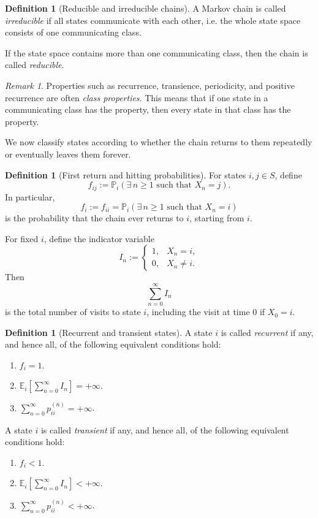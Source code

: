 \documentclass[11pt]{article}
\theoremstyle{plain}
\theoremstyle{definition}
\newtheorem{definition}[theorem]{Definition}
\theoremstyle{remark}
\newtheorem{remark}[theorem]{Remark}
\begin{document}
\begin{definition}[Reducible and irreducible chains]
	A Markov chain is called \emph{irreducible} if all states communicate with each other, i.e. the whole state space consists of one communicating class.
	
	If the state space contains more than one communicating class, then the chain is called \emph{reducible}.
\end{definition}

\begin{remark}
	Properties such as recurrence, transience, periodicity, and positive recurrence are often \emph{class properties}. This means that if one state in a communicating class has the property, then every state in that class has the property.
\end{remark}





We now classify states according to whether the chain returns to them repeatedly or eventually leaves them forever.

\begin{definition}[First return and hitting probabilities]
	For states \(i,j\in S\), define
	\[
	f_{ij}:=\mathbb{P}_i(\exists\, n\ge 1 \text{ such that } X_n=j).
	\]
	In particular,
	\[
	f_i:=f_{ii}
	=
	\mathbb{P}_i(\exists\, n\ge 1 \text{ such that } X_n=i)
	\]
	is the probability that the chain ever returns to \(i\), starting from \(i\).
\end{definition}

For fixed \(i\), define the indicator variable
\[
I_n
:=
\begin{cases}
	1, & X_n=i,\\
	0, & X_n\neq i.
\end{cases}
\]
Then
\[
\sum_{n=0}^{\infty}I_n
\]
is the total number of visits to state \(i\), including the visit at time \(0\) if \(X_0=i\).

\begin{definition}[Recurrent and transient states]
	A state \(i\) is called \emph{recurrent} if any, and hence all, of the following equivalent conditions hold:
	\begin{enumerate}
		\item \(f_i=1\).
		\item \(\displaystyle \mathbb{E}_i\!\left[\sum_{n=0}^{\infty}I_n\right]=+\infty\).
		\item \(\displaystyle \sum_{n=0}^{\infty}p_{ii}^{(n)}=+\infty\).
	\end{enumerate}
	
	A state \(i\) is called \emph{transient} if any, and hence all, of the following equivalent conditions hold:
	\begin{enumerate}
		\item \(f_i<1\).
		\item \(\displaystyle \mathbb{E}_i\!\left[\sum_{n=0}^{\infty}I_n\right]<+\infty\).
		\item \(\displaystyle \sum_{n=0}^{\infty}p_{ii}^{(n)}<+\infty\).
	\end{enumerate}
\end{definition}
\end{document}

